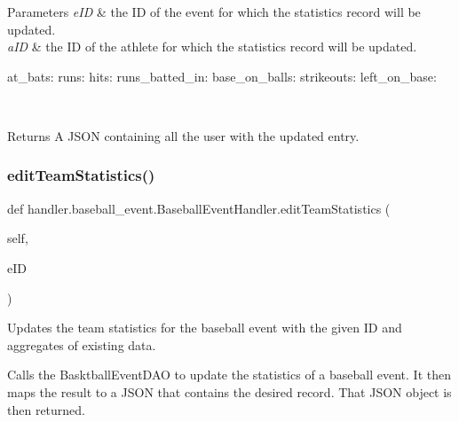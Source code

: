 \begin{DoxyParams}{Parameters}
{\em e\+ID} & the ID of the event for which the statistics record will be updated. \\
\hline
{\em a\+ID} & the ID of the athlete for which the statistics record will be updated. \begin{DoxyVerb}           at_bats:
           runs:
           hits:
           runs_batted_in:
           base_on_balls:
           strikeouts:
           left_on_base:
\end{DoxyVerb}
\\
\hline
\end{DoxyParams}
\begin{DoxyReturn}{Returns}
A J\+S\+ON containing all the user with the updated entry. 
\end{DoxyReturn}
\mbox{\label{classhandler_1_1baseball__event_1_1_baseball_event_handler_af199d1995fcbe5b232ac24ca5191bd5c}} 
\subsubsection{\texorpdfstring{edit\+Team\+Statistics()}{editTeamStatistics()}}
{\footnotesize\ttfamily def handler.\+baseball\+\_\+event.\+Baseball\+Event\+Handler.\+edit\+Team\+Statistics (\begin{DoxyParamCaption}\item[{}]{self,  }\item[{}]{e\+ID }\end{DoxyParamCaption})}



Updates the team statistics for the baseball event with the given ID and aggregates of existing data. 

Calls the Basktball\+Event\+D\+AO to update the statistics of a baseball event. It then maps the result to a J\+S\+ON that contains the desired record. That J\+S\+ON object is then returned.


